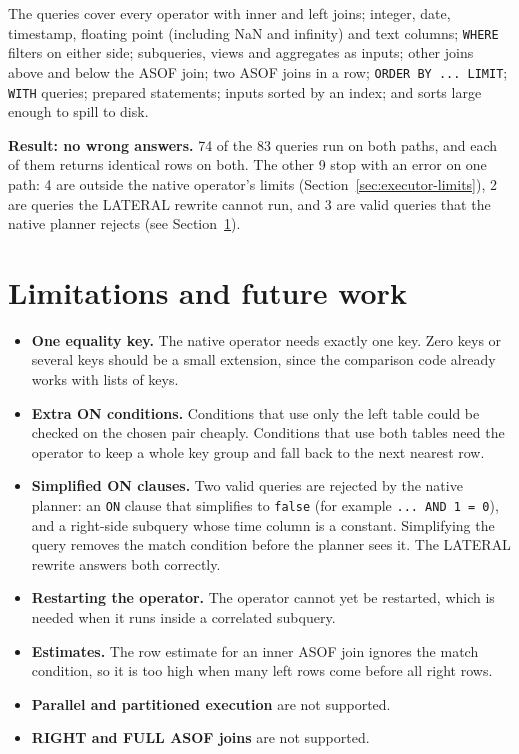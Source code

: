 \documentclass[11pt,a4paper]{article}
\newcommand{\code}[1]{\texttt{#1}}
\begin{document}
The queries cover every operator with inner and left joins; integer, date, timestamp,
floating point (including NaN and infinity) and text columns; \code{WHERE} filters on
either side; subqueries, views and aggregates as inputs; other joins above and below the
ASOF join; two ASOF joins in a row; \code{ORDER BY ... LIMIT}; \code{WITH} queries;
prepared statements; inputs sorted by an index; and sorts large enough to spill to disk.

\textbf{Result: no wrong answers.} 74 of the 83 queries run on both paths, and each of them
returns identical rows on both. The other 9 stop with an error on one path: 4 are outside
the native operator's limits (Section~\ref{sec:executor-limits}), 2 are queries the
LATERAL rewrite cannot run, and 3 are valid queries that the native planner rejects (see
Section~\ref{sec:limits}).

\section{Limitations and future work}
\label{sec:limits}

\begin{itemize}
  \item \textbf{One equality key.} The native operator needs exactly one key. Zero keys
        or several keys should be a small extension, since the comparison code already
        works with lists of keys.
  \item \textbf{Extra ON conditions.} Conditions that use only the left table could be
        checked on the chosen pair cheaply. Conditions that use both tables need the
        operator to keep a whole key group and fall back to the next nearest row.
  \item \textbf{Simplified ON clauses.} Two valid queries are rejected by the native
        planner: an \code{ON} clause that simplifies to \code{false} (for example
        \code{... AND 1 = 0}), and a right-side subquery whose time column is a constant.
        Simplifying the query removes the match condition before the planner sees it.
        The LATERAL rewrite answers both correctly.
  \item \textbf{Restarting the operator.} The operator cannot yet be restarted, which is
        needed when it runs inside a correlated subquery.
  \item \textbf{Estimates.} The row estimate for an inner ASOF join ignores the match
        condition, so it is too high when many left rows come before all right rows.
  \item \textbf{Parallel and partitioned execution} are not supported.
  \item \textbf{RIGHT and FULL ASOF joins} are not supported.
\end{itemize}
\end{document}
